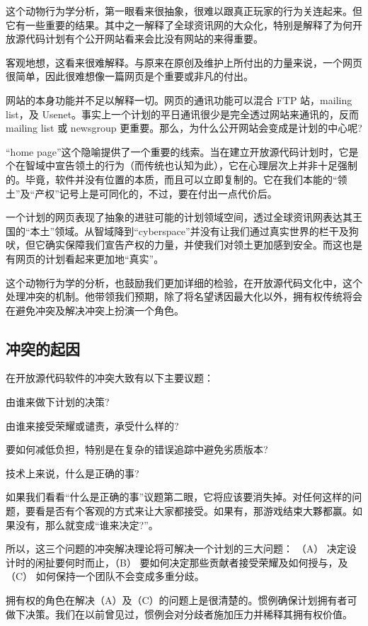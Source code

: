 这个动物行为学分析，第一眼看来很抽象，很难以跟真正玩家的行为关连起来。但它有一些重要的结果。其中之一解释了全球资讯网的大众化，特别是解释了为何开放源代码计划有个公开网站看来会比没有网站的来得重要。

客观地想，这看来很难解释。与原来在原创及维护上所付出的力量来说，一个网页很简单，因此很难想像一篇网页是个重要或非凡的付出。

网站的本身功能并不足以解释一切。网页的通讯功能可以混合 FTP 站，mailing list，及 Usenet。事实上一个计划的平日通讯很少是完全透过网站来通讯的，反而 mailing list 或 newsgroup 更重要。那么，为什么公开网站会变成是计划的中心呢?

“home page”这个隐喻提供了一个重要的线索。当在建立开放源代码计划时，它是个在智域中宣告领土的行为（而传统也认知为此），它在心理层次上并非十足强制的。毕竟，软件并没有位置的本质，而且可以立即复制的。它在我们本能的“领土”及“产权”记号上是可同化的，不过，要在付出一点代价后。

一个计划的网页表现了抽象的进驻可能的计划领域空间，透过全球资讯网表达其王国的“本土”领域。从智域降到“cyberspace”并没有让我们通过真实世界的栏干及狗吠，但它确实保障我们宣告产权的力量，并使我们对领土更加感到安全。而这也是有网页的计划看起来更加地“真实”。

这个动物行为学的分析，也鼓励我们更加详细的检验，在开放源代码文化中，这个处理冲突的机制。他带领我们预期，除了将名望诱因最大化以外，拥有权传统将会在避免冲突及解决冲突上扮演一个角色。

\subsection{冲突的起因}
在开放源代码软件的冲突大致有以下主要议题：

由谁来做下计划的决策?

由谁来接受荣耀或谴责，承受什么样的?

要如何减低负担，特别是在复杂的错误追踪中避免劣质版本?

技术上来说，什么是正确的事?

如果我们看看“什么是正确的事”议题第二眼，它将应该要消失掉。对任何这样的问题，要看是否有个客观的方式来让大家都接受。如果有，那游戏结束大夥都赢。如果没有，那么就变成“谁来决定?”。

所以，这三个问题的冲突解决理论将可解决一个计划的三大问题： （A） 决定设计时的闲扯要何时而止，（B） 要如何决定那些贡献者接受荣耀及如何授与，及 （C） 如何保持一个团队不会变成多重分歧。

拥有权的角色在解决（A）及（C）的问题上是很清楚的。惯例确保计划拥有者可做下决策。我们在以前曾见过，惯例会对分歧者施加压力并稀释其拥有权价值。

